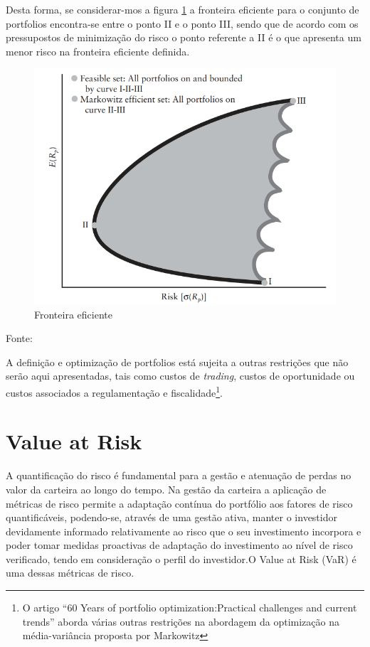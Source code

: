 \documentclass[
  12pt,
  a4paper,
  openany]{book}
\begin{document}
Desta forma, se considerar-mos a figura \ref{fig:eficient} a fronteira eficiente para o conjunto de portfolios encontra-se entre o ponto II e o ponto III, sendo que de acordo com os pressupostos de minimização do risco o ponto referente a II é o que apresenta um menor risco na fronteira eficiente definida.



\begin{figure}

{\centering \includegraphics[width=0.6\linewidth]{image/eficient} 

}

\caption{Fronteira eficiente}\label{fig:eficient}
\end{figure}
\FloatBarrier
\centering

Fonte: \citep[p.33]{invest}

\justifying
\medskip

A definição e optimização de portfolios está sujeita a outras restrições que não serão aqui apresentadas, tais como custos de \emph{trading}, custos de oportunidade ou custos associados a regulamentação e fiscalidade\footnote{O artigo \citet{Fabozzi2014} ``60 Years of portfolio optimization:Practical challenges and current trends'' aborda várias outras restrições na abordagem da optimização na média-variância proposta por Markowitz}.

\hypertarget{value-at-risk}{%
\section{Value at Risk}\label{value-at-risk}}

A quantificação do risco é fundamental para a gestão e atenuação de perdas no valor da carteira ao longo do tempo. Na gestão da carteira a aplicação de métricas de risco permite a adaptação contínua do portfólio aos fatores de risco quantificáveis, podendo-se, através de uma gestão ativa, manter o investidor devidamente informado relativamente ao risco que o seu investimento incorpora e poder tomar medidas proactivas de adaptação do investimento ao nível de risco verificado, tendo em consideração o perfil do investidor.O Value at Risk (VaR) é uma dessas métricas de risco.
\end{document}

